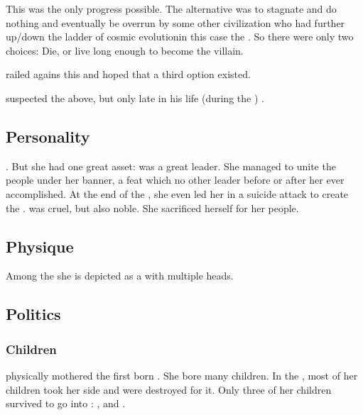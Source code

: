 This was the only progress possible. 
The alternative was to stagnate and do nothing and eventually be overrun by some other civilization who had  further up/down the ladder of cosmic evolution\dash in this case the \banes. 
So there were only two choices: 
Die, or live long enough to become the villain. 

\Sethicus railed agains this and hoped that a third option existed. 

\Iscrafel suspected the above, but only late in his life (during the \thirdbanewar) . 










\subsection{Personality}
\Kserasshana{} . 
But she had one great asset: 
\Kserasshana{} was a great leader. 
She managed to unite the \dzraicchenoss{} people under her banner, a feat which no other leader before or after her ever accomplished. 
At the end of the \firstbanewar, she even led her \firstgendragons{} in a suicide attack to create the . 
\Kserasshana{} was cruel, but also noble. 
She sacrificed herself for her people. 









\subsection{Physique}
Among the \dragons{} she is depicted as a \dragon{} with multiple heads. 









\subsection{Politics}





\subsubsection{Children}
\Tiamat physically mothered the first born \dragons. 
She bore many children.
In the , most of her children took her side and were destroyed for it. 
Only three of her children survived to go into :
\Nexagglachel, \Ishnaruchaefir and \Secherdamon. 









